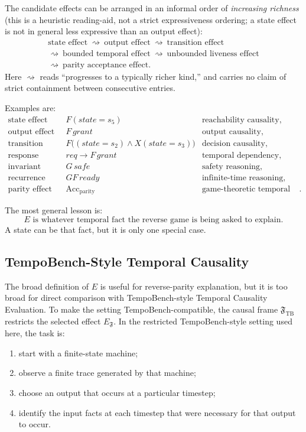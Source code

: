 \documentclass[11pt]{article}
\theoremstyle{remark}
\newcommand{\Frame}{\mathfrak{F}}
\begin{document}
The candidate effects can be arranged in an informal order of \emph{increasing
richness} (this is a heuristic reading-aid, not a strict expressiveness ordering;
a state effect is not in general less expressive than an output effect):
\[
\begin{array}{c}
  \text{state effect}
  \ \rightsquigarrow\ 
  \text{output effect}
  \ \rightsquigarrow\ 
  \text{transition effect}
  \\[2pt]
  \rightsquigarrow\ 
  \text{bounded temporal effect}
  \ \rightsquigarrow\ 
  \text{unbounded liveness effect}
  \\[2pt]
  \rightsquigarrow\ 
  \text{parity acceptance effect}.
\end{array}
\]
Here \(\rightsquigarrow\) reads ``progresses to a typically richer kind,'' and
carries no claim of strict containment between consecutive entries.

Examples are:
\[
\begin{array}{lll}
  \text{state effect} & F(state=s_5) & \text{reachability causality},\\
  \text{output effect} & F\,grant & \text{output causality},\\
  \text{transition effect} &
    F\bigl((state=s_2)\land X(state=s_3)\bigr) &
    \text{decision causality},\\
  \text{response effect} &
    req\rightarrow F\,grant &
    \text{temporal dependency},\\
  \text{invariant effect} &
    G\,safe &
    \text{safety reasoning},\\
  \text{recurrence effect} &
    GF\,ready &
    \text{infinite-time reasoning},\\
  \text{parity effect} &
    \mathrm{Acc}_{\mathrm{parity}} &
    \text{game-theoretic temporal reasoning}.
\end{array}
\]

The most general lesson is:
\[
\boxed{
  E \text{ is whatever temporal fact the reverse game is being asked to
  explain.}
}
\]
A state can be that fact, but it is only one special case.

\subsection{TempoBench-Style Temporal Causality}

The broad definition of \(E\) is useful for reverse-parity explanation, but it
is too broad for direct comparison with TempoBench-style Temporal Causality
Evaluation. To make the setting TempoBench-compatible, the causal frame
\(\Frame_{\mathrm{TB}}\) restricts the selected effect \(E_{\Frame}\). In the
restricted TempoBench-style setting used here, the task is:
\begin{enumerate}[label=\arabic*.]
  \item start with a finite-state machine;
  \item observe a finite trace generated by that machine;
  \item choose an output that occurs at a particular timestep;
  \item identify the input facts at each timestep that were necessary for that
        output to occur.
\end{enumerate}
\end{document}
